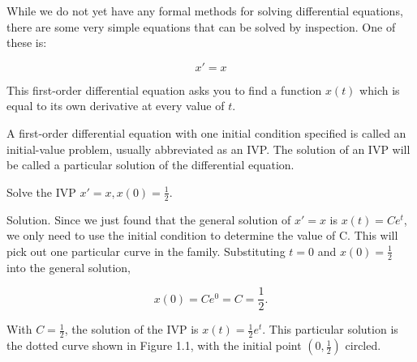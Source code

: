   While we do not yet have any formal methods for solving differential equations, there are some very simple equations that can be solved by inspection. One of these is:

  \[
    x' = x
  \]

  This first-order differential equation asks you to find a function $x(t)$ which is equal to its own derivative at every value of $t$.

  \begin{definition}
    A first-order differential equation with one initial condition specified is called an initial-value problem, usually abbreviated as an IVP. The solution of an IVP will be called a particular solution of the differential equation.
  \end{definition}

  \begin{problem}
    Solve the IVP $x'=x, x(0)=\frac{1}{2}$.

    Solution. Since we just found that the general solution of $x'=x$ is $x(t)=Ce^t$, we only need to use the initial condition to determine the value of C. This will pick out one particular curve in the family. Substituting $t=0$ and $x(0)=\frac{1}{2}$ into the general solution,

    \[
      x(0)=Ce^0=C=\frac{1}{2}.
    \]

    With $C=\frac{1}{2}$, the solution of the IVP is $x(t)=\frac{1}{2}e^t$. This particular solution is the dotted curve shown in Figure 1.1, with the initial point $(0,\frac{1}{2})$ circled.
  \end{problem}